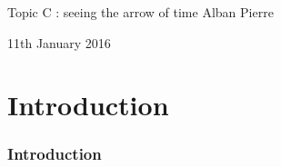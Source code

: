 \documentclass[french]{beamer}
\begin{document}
	\begin{frame}
	\begin{center}
	Topic C : seeing the arrow of time
\newline
\newline
Alban Pierre

11th January 2016
\end{center}
	\end{frame}
	
	\begin{frame}
	
  \tableofcontents[]
\end{frame} 

	\section{Introduction}
	\begin{frame}
	\frametitle{Introduction}
	

\end{frame}
\end{document}
